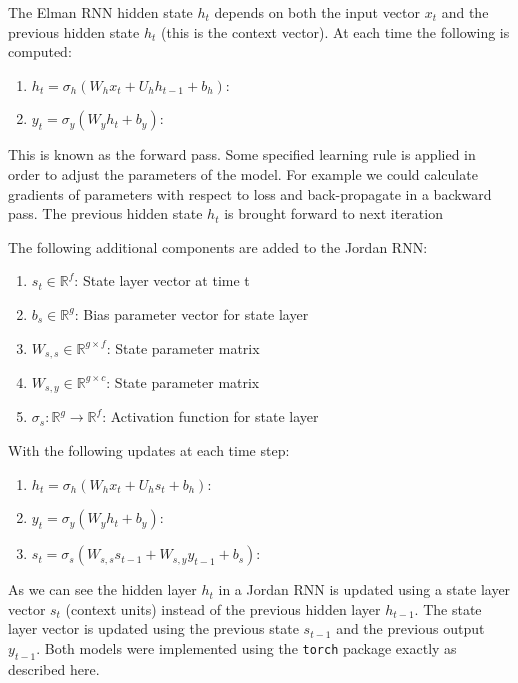 \documentclass[conference]{IEEEtran}
\begin{document}

The Elman RNN hidden state $h_t$ depends on both the input vector $x_t$ and the previous hidden state $h_t$ (this is the context vector). At each time the following is computed:

\begin{enumerate}
	\item $h_t = \sigma_h(W_h x_t + U_h h_{t-1} + b_h)$: 
	\item $y_t = \sigma_y(W_y h_t + b_y)$: 
\end{enumerate}

This is known as the forward pass. Some specified learning rule is applied in order to adjust the parameters of the model. For example we could calculate gradients of parameters with respect to loss and back-propagate in a backward pass. The previous hidden state $h_t$ is brought forward to next iteration 

The following additional components are added to the Jordan RNN:

\begin{enumerate}
	\item $s_t \in \mathbb{R}^f$: State layer vector at time t
	
	\item $b_s \in \mathbb{R}^{g}$: Bias parameter vector for state layer
	
	\item $W_{s,s} \in \mathbb{R}^{g \times f}$: State parameter matrix
	\item $W_{s,y} \in \mathbb{R}^{g \times c}$: State parameter matrix
	
	\item $\sigma_s: \mathbb{R}^g \to \mathbb{R}^f$: Activation function for state layer
	
	
	
\end{enumerate}

With the following updates at each time step:

\begin{enumerate}
	\item $h_t = \sigma_h(W_h x_t + U_h s_t + b_h)$: 
	\item $y_t = \sigma_y(W_y h_t + b_y)$: 
	\item $s_t = \sigma_s(W_{s,s} s_{t-1} + W_{s,y} y_{t-1} + b_s)$: 
\end{enumerate}

As we can see the hidden layer $h_t$ in a Jordan RNN is updated using a state layer vector $s_t$ (context units) instead of the previous hidden layer $h_{t-1}$. The state layer vector is updated using the previous state $s_{t-1}$ and the previous output $y_{t-1}$. Both models were implemented using the \texttt{torch} package exactly as described here.
\end{document}
